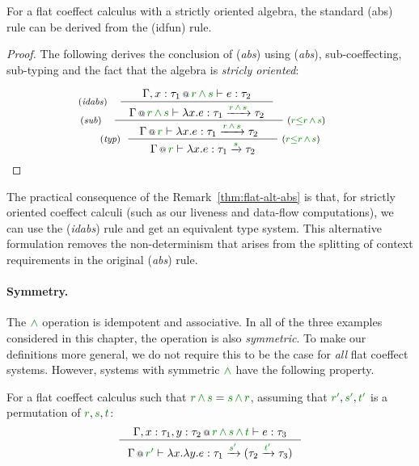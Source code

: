 \begin{remark}
\label{thm:flat-alt-abs}
For a flat coeffect calculus with a strictly oriented algebra, the standard (abs) rule can 
be derived from the (idfun) rule.
\end{remark}
\begin{proof}
The following derives the conclusion of (\emph{abs}) using (\emph{abs}), sub-coeffecting, 
sub-typing and the fact that the algebra is \emph{stricly oriented}:

\begin{equation*}
\tyrule{typ}
  {\hspace{-5em} \tyrule{sub}
     {\hspace{-4em} \tyrule{idabs}  
        {\coctx{\Gamma, x:\tau_1}{\cclrd{r} \,\czip\, \cclrd{s}} \vdash e : \tau_2}
        {\coctx{\Gamma}{\cclrd{r} \,\czip\, \cclrd{s}} \vdash \lambda x.e : \tau_1 \xrightarrow{\cclrd{r} \,\czip\, \cclrd{s}} \tau_2 } }
     {\coctx{\Gamma}{\cclrd{r}} \vdash \lambda x.e : \tau_1 \xrightarrow{\cclrd{r} \,\czip\, \cclrd{s}} \tau_2} \;
           \textnormal{\footnotesize{($\cclrd{r} \cleq \cclrd{r} \,\czip\, \cclrd{s}$)}} \hspace{-5em} }
  {\coctx{\Gamma}{\cclrd{r}} \vdash \lambda x.e : \tau_1 \xrightarrow{\cclrd{s}} \tau_2} \; 
           \textnormal{\footnotesize{($\cclrd{r} \cleq \cclrd{r} \,\czip\, \cclrd{s}$)}}
\end{equation*}
\end{proof}

\noindent
The practical consequence of the Remark~\ref{thm:flat-alt-abs} is that, for strictly
oriented coeffect calculi (such as our liveness and data-flow computations), we can use
the (\emph{idabs}) rule and get an equivalent type system. This alternative formulation
removes the non-determinism that arises from the splitting of context requirements in 
the original (\emph{abs}) rule.

\paragraph{Symmetry.}
The $\czip$ operation is idempotent and associative. In all of the three examples considered in 
this chapter, the operation is also \emph{symmetric}. To make our definitions more general, we
do not require this to be the case for \emph{all} flat coeffect systems. However, systems with
symmetric $\czip$ have the following property.

\begin{remark}
For a flat coeffect calculus such that $\cclrd{r}\,\czip\,\cclrd{s} = \cclrd{s}\,\czip\,\cclrd{r}$,
assuming that $\cclrd{r'}, \cclrd{s'}, \cclrd{t'}$ is a permutation of $\cclrd{r},\cclrd{s},\cclrd{t}$:
%
\begin{equation*}
\inference
  {\coctx{\Gamma, x:\tau_1, y:\tau_2}{\cclrd{r} \,\czip\, \cclrd{s} \,\czip\, \cclrd{t}} \vdash e : \tau_3}
  {\coctx{\Gamma}{\cclrd{r'}} \vdash \lambda x.\lambda y.e : 
      \tau_1 \xrightarrow{\cclrd{s'}} (\tau_2 \xrightarrow{\cclrd{t'}} \tau_3) }
\end{equation*} 
\end{remark}

